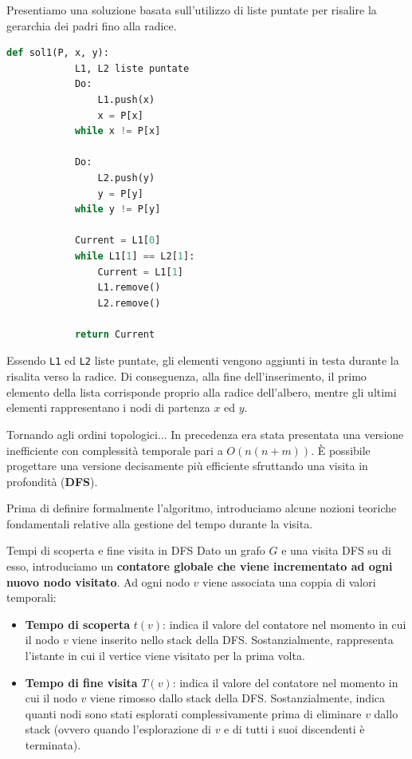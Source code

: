 \documentclass[12pt]{report}
\begin{document}
	Presentiamo una soluzione basata sull'utilizzo di liste puntate per risalire la gerarchia dei padri fino alla radice.
	
	\begin{lstlisting}[style=stile-listings, language=Python]
		def sol1(P, x, y):
			L1, L2 liste puntate
			Do:
				L1.push(x)
				x = P[x]
			while x != P[x]
			
			Do:
				L2.push(y)
				y = P[y]
			while y != P[y]
			
			Current = L1[0]
			while L1[1] == L2[1]:
				Current = L1[1]
				L1.remove()
				L2.remove()
			
			return Current
	\end{lstlisting}
	
	\begin{osservazione}{}{}
		Essendo \texttt{L1} ed \texttt{L2} liste puntate, gli elementi vengono aggiunti in testa durante la risalita verso la radice. Di conseguenza, alla fine dell'inserimento, il primo elemento della lista corrisponde proprio alla radice dell'albero, mentre gli ultimi elementi rappresentano i nodi di partenza $x$ ed $y$.
	\end{osservazione}
	
	Tornando agli ordini topologici...
	In precedenza era stata presentata una versione inefficiente con complessità temporale pari a $O(n(n+m))$. È possibile progettare una versione decisamente più efficiente sfruttando una visita in profondità (\textbf{DFS}). 
	
	Prima di definire formalmente l'algoritmo, introduciamo alcune nozioni teoriche fondamentali relative alla gestione del tempo durante la visita.
	
	\begin{definizione}{Tempi di scoperta e fine visita in DFS}{}
		Dato un grafo $G$ e una visita DFS su di esso, introduciamo un \textbf{contatore globale che viene incrementato ad ogni nuovo nodo visitato}. Ad ogni nodo $v$ viene associata una coppia di valori temporali:
		\begin{itemize}
			\item \textbf{Tempo di scoperta} $t(v)$: indica il valore del contatore nel momento in cui il nodo $v$ viene inserito nello stack della DFS. Sostanzialmente, rappresenta l'istante in cui il vertice viene visitato per la prima volta.
			\item \textbf{Tempo di fine visita} $T(v)$: indica il valore del contatore nel momento in cui il nodo $v$ viene rimosso dallo stack della DFS. Sostanzialmente, indica quanti nodi sono stati esplorati complessivamente prima di eliminare $v$ dallo stack (ovvero quando l'esplorazione di $v$ e di tutti i suoi discendenti è terminata).
		\end{itemize}
	\end{definizione}
	
\end{document}
